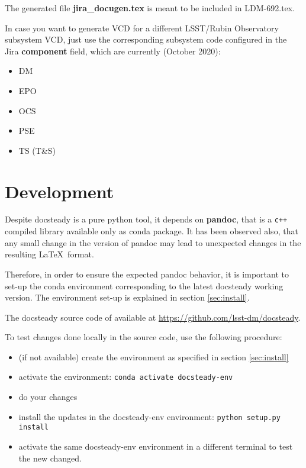 \documentclass[DM]{lsstdoc}
\begin{document}
The generated file \textbf{jira\_docugen.tex} is meant to be included in LDM-692.tex.

In case you want to generate VCD for a different LSST/Rubin Observatory subsystem VCD,
just use the corresponding subsystem code configured in the Jira \textbf{component} field, which are currently (October 2020):

\begin{itemize}
\item DM
\item EPO
\item OCS
\item PSE
\item TS (T\&S)
\end{itemize}



\section{Development}
\label{sec:development}

Despite docsteady is a pure python tool, it depends on \textbf{pandoc}, that is a \texttt{c++} compiled library available only as conda package.
It has been observed also, that any small change in the version of pandoc may lead to unexpected changes in the resulting \LaTeX~format.

Therefore, in order to ensure the expected pandoc behavior, it is important to set-up the conda environment corresponding to the latest docsteady working version.
The environment set-up is explained in section \ref{sec:install}.

The docsteady source code of available at \url{https://github.com/lsst-dm/docsteady}.

To test changes done locally in the source code, use the following procedure:

\begin{itemize}
\item (if not available) create the environment as specified in section \ref{sec:install}
\item activate the environment: \texttt{conda activate docsteady-env}
\item do your changes
\item install the updates in the docsteady-env environment: \texttt{python setup.py install}
\item activate the same docsteady-env environment in a different terminal to test the new changed.
\end{itemize}
\end{document}
